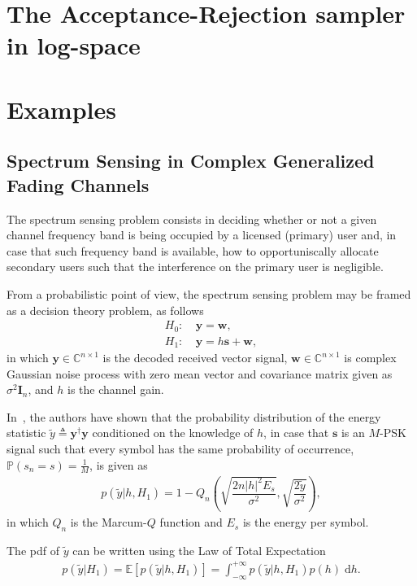 \documentclass[conference, 10pt]{IEEEtran}
\begin{document}
\section{The Acceptance-Rejection sampler in log-space}

\section{Examples}
\subsection{Spectrum Sensing in Complex Generalized Fading Channels}

The spectrum sensing problem consists in deciding whether or not a given channel
frequency band is being occupied by a licensed (primary) user and, in case that such
frequency band is available, how to opportuniscally allocate secondary users
such that the interference on the primary user is negligible.

From a probabilistic point of view, the spectrum sensing problem may be framed as
a decision theory problem, as follows
\begin{align}
    H_0:~& \bm{y} = \bm{w},\\
    H_1:~& \bm{y} = h\bm{s} + \bm{w},
\end{align}
in which $\bm{y} \in \mathbb{C}^{n\times 1}$ is the decoded received vector signal,
$\bm{w} \in \mathbb{C}^{n\times 1}$ is complex Gaussian noise process with zero mean
vector and covariance matrix given as $\sigma^2\bm{I}_n$, and $h$ is the channel gain.

In~\cite{cardoso2017}, the authors have shown that the probability distribution of the
energy statistic $\tilde{y} \triangleq \bm{y}^{\dagger}\bm{y}$ conditioned on the knowledge of $h$,
in case that $\bm{s}$ is an $M$-PSK signal such that every symbol has the same probability of occurrence,
$\mathbb{P}(s_n = s) = \frac{1}{M}$, is given as
\begin{align}
    p(\tilde{y} | h, H_1) = 1 - Q_{n}\left(\sqrt{\dfrac{2n|h|^2E_s}{\sigma^2}}, \sqrt{\dfrac{2\tilde{y}}{\sigma^2}}\right),
\end{align}
in which $Q_{n}$ is the Marcum-$Q$ function and $E_s$ is the energy per symbol.

The pdf of $\tilde{y}$ can be written using the Law of Total Expectation
\begin{align}
    p(\tilde{y} | H_1) = \mathbb{E}\left[p(\tilde{y} | h, H_{1})\right]
                 = \int_{-\infty}^{+\infty} p(\tilde{y} | h, H_1)p(h)\;\mathrm{d}h.
\end{align}
\end{document}
